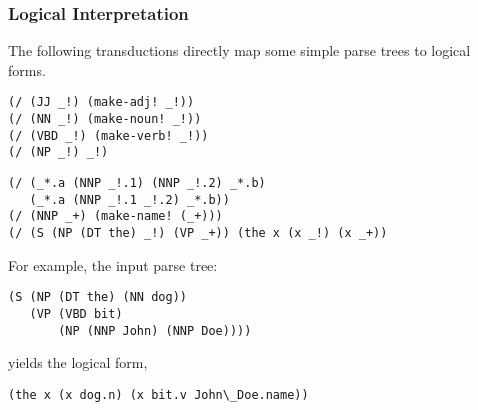 \documentclass[8pt]{beamer}
\begin{document}
\begin{frame}[fragile]
  \frametitle{Logical Interpretation}
The following transductions directly map some simple parse trees to logical forms. 
\begin{multicols}{2}
\begin{verbatim}
(/ (JJ _!) (make-adj! _!))
(/ (NN _!) (make-noun! _!))
(/ (VBD _!) (make-verb! _!))
(/ (NP _!) _!)
\end{verbatim}
\begin{verbatim}
(/ (_*.a (NNP _!.1) (NNP _!.2) _*.b)
   (_*.a (NNP _!.1 _!.2) _*.b))
(/ (NNP _+) (make-name! (_+)))
(/ (S (NP (DT the) _!) (VP _+)) (the x (x _!) (x _+))
\end{verbatim}
\end{multicols}
For example, the input parse tree:
\begin{verbatim}
(S (NP (DT the) (NN dog)) 
   (VP (VBD bit) 
       (NP (NNP John) (NNP Doe))))
\end{verbatim}

yields the logical form, 
\begin{verbatim}
(the x (x dog.n) (x bit.v John\_Doe.name))
\end{verbatim}
\end{frame}
\end{document}
